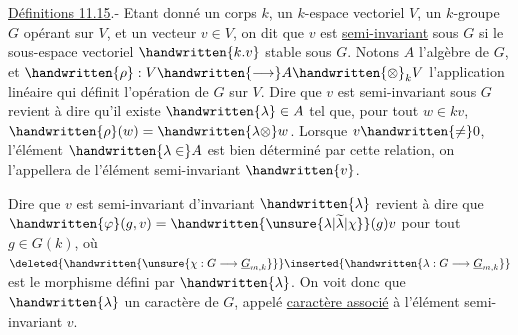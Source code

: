 \uline{Définitions 11.15}.- Etant donné un corps $k$, un $k$-espace vectoriel $V$, un $k$-groupe $G$ opérant sur $V$, et un vecteur $v\in V$, on dit que $v$ est \uline{semi-invariant} sous $G$ si le sous-espace vectoriel $\handwritten{k.v}$  stable sous $G$.
Notons $A$ l'algèbre de $G$, et $\handwritten{\rho}:V\handwritten{\longrightarrow}A\handwritten{\otimes}_k V$ l'application linéaire qui définit l'opération de $G$ sur $V$. Dire que $v$ est semi-invariant sous $G$ revient à dire  qu'il existe $\handwritten{\lambda}\in A$ tel que, pour tout $w\in kv$, $\handwritten{\rho}(w)=\handwritten{\lambda\otimes}w$. Lorsque $v\handwritten{\neq}0$, l'élément $\handwritten{\lambda\in}A$ est bien déterminé par cette relation, on l'appellera  de l'élément semi-invariant $\handwritten{v}$.

 Dire que $v$ est semi-invariant  d'invariant $\handwritten{\lambda}$ revient à dire que $\handwritten{\varphi}(g,v)=\handwritten{\unsure{\lambda|\widetilde{\lambda}|\chi}}(g)v$ pour tout $g\in G(k)$, où $\deleted{\handwritten{\unsure{\chi:G\longrightarrow\underline{G}_{m,k}}}}\inserted{\handwritten{\lambda:G\longrightarrow\underline{G}_{m,k}}}$ est le morphisme défini par $\handwritten{\lambda}$. On voit donc que $\handwritten{\lambda}$  un caractère \deleted{\handwritten{\unsure{$\chi$}}} de $G$, appelé \uline{caractère associé} à l'élément semi-invariant $v$. 
\margin{\handwritten{!}}

